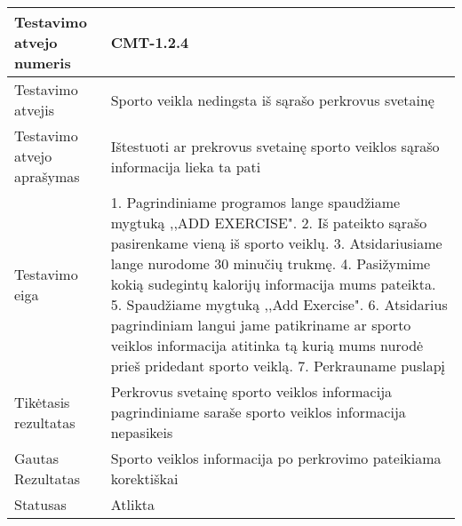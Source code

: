 \documentclass[oneside]{VUMIFPSkursinis}
\begin{document}
\begin{center}
    \begin{tabular}{ |p{5cm}|p{13cm}|}
    \hline
        Testavimo atvejo numeris & CMT-1.2.4  \\ \hline
        Testavimo atvejis & Sporto veikla nedingsta iš sąrašo perkrovus svetainę  \\ \hline
        Testavimo atvejo aprašymas & Ištestuoti ar prekrovus svetainę sporto veiklos sąrašo informacija lieka ta pati  \\ \hline
        Testavimo eiga &  1. Pagrindiniame programos lange spaudžiame mygtuką ,,ADD EXERCISE". 
				2. Iš pateikto sąrašo pasirenkame vieną iš sporto veiklų. 
				3. Atsidariusiame lange nurodome 30 minučių trukmę.
				4. Pasižymime kokią sudegintų kalorijų informacija mums pateikta. 
				5. Spaudžiame mygtuką ,,Add Exercise".
				6. Atsidarius pagrindiniam langui jame patikriname ar sporto veiklos informacija atitinka tą kurią mums nurodė prieš pridedant sporto veiklą.
				7. Perkrauname puslapį \\ \hline
        Tikėtasis rezultatas &  Perkrovus svetainę sporto veiklos informacija pagrindiniame saraše sporto veiklos informacija nepasikeis\\ \hline
        Gautas Rezultatas & Sporto veiklos informacija po perkrovimo pateikiama korektiškai  \\ \hline
        Statusas & Atlikta  \\ \hline
    \hline
    \end{tabular}
\end{center}
\end{document}
